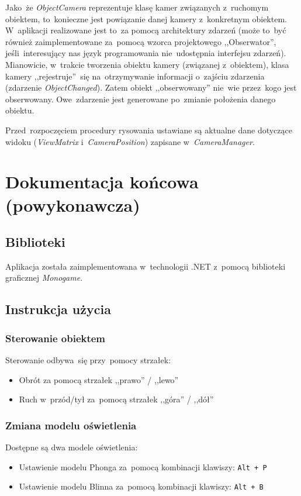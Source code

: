 \documentclass[11pt, a4paper, oneside]{scrartcl}
\begin{document}
Jako~że \textit{ObjectCamera} reprezentuje klasę kamer związanych z~ruchomym obiektem, to~konieczne jest powiązanie danej kamery z~konkretnym
obiektem. W~aplikacji realizowane jest to~za pomocą architektury zdarzeń (może to~być również zaimplementowane za~pomocą wzorca projektowego ,,Obserwator'', jeśli~interesujący nas język programowania nie~udostępnia interfejsu zdarzeń). Mianowicie, w~trakcie tworzenia obiektu
kamery (związanej z~obiektem), klasa kamery ,,rejestruje''~się na~otrzymywanie informacji o~zajściu zdarzenia (zdarzenie \textit{ObjectChanged}).
Zatem obiekt ,,obserwowany'' nie~wie przez~kogo jest obserwowany. Owe~zdarzenie jest generowane po~zmianie położenia danego obiektu.

Przed~rozpoczęciem procedury rysowania ustawiane są aktualne dane dotyczące widoku (\textit{ViewMatrix} i~\textit{CameraPosition}) zapisane
w~\textit{CameraManager}.

\section{Dokumentacja końcowa (powykonawcza)}
\subsection{Biblioteki}
Aplikacja została zaimplementowana w~technologii .NET z~pomocą biblioteki graficznej \textit{Monogame}.
\subsection{Instrukcja użycia}
\subsubsection{Sterowanie obiektem}
Sterowanie odbywa~się przy~pomocy strzałek: 
\begin{itemize}
	\item Obrót za pomocą strzałek ,,prawo'' / ,,lewo''
	\item Ruch w~przód/tył za~pomocą strzałek ,,góra'' / ,,dół''
\end{itemize}
\subsubsection{Zmiana modelu oświetlenia}
Dostępne są dwa modele oświetlenia:
\begin{itemize}
	\item Ustawienie modelu Phonga za~pomocą kombinacji klawiszy: \texttt{Alt + P}
	\item Ustawienie modelu Blinna za~pomocą kombinacji klawiszy: \texttt{Alt + B}
\end{itemize}
\end{document}
